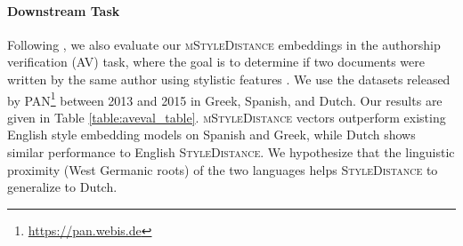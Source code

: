 \paragraph{Downstream Task}

Following \citet{patel2024styledistancestrongercontentindependentstyle}, we also evaluate our \textsc{mStyleDistance} embeddings in the authorship verification (AV) task, where the goal is to determine if two documents were written by the same author using stylistic features \citep{authorshipverification}. We use the datasets released by PAN\footnote{\url{https://pan.webis.de}} between 2013 and 2015 in Greek, Spanish, and Dutch. Our results are given in Table \ref{table:aveval_table}. \textsc{mStyleDistance} vectors outperform existing English style embedding models on Spanish and Greek, while Dutch shows similar performance to English \textsc{StyleDistance}. We hypothesize that the linguistic proximity (West Germanic roots) of the two languages helps \textsc{StyleDistance} to generalize to Dutch.






